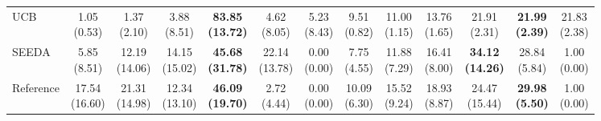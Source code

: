 {\begin{tabular}{l|cccccc|cccccc}
UCB & \makecell{1.05 \\ (0.53)} & \makecell{1.37 \\ (2.10)} & \makecell{3.88 \\ (8.51)} & {\cellcolor[HTML]{C8E6C9}} \bfseries \makecell{83.85 \\ (13.72)} & \makecell{4.62 \\ (8.05)} & \makecell{5.23 \\ (8.43)} & \makecell{9.51 \\ (0.82)} & \makecell{11.00 \\ (1.15)} & \makecell{13.76 \\ (1.65)} & {\cellcolor[HTML]{C8E6C9}} \makecell{21.91 \\ (2.31)} & \bfseries \makecell{21.99 \\ (2.39)} & \makecell{21.83 \\ (2.38)} \\
SEEDA & \makecell{5.85 \\ (8.51)} & \makecell{12.19 \\ (14.06)} & \makecell{14.15 \\ (15.02)} & {\cellcolor[HTML]{C8E6C9}} \bfseries \makecell{45.68 \\ (31.78)} & \makecell{22.14 \\ (13.78)} & \makecell{0.00 \\ (0.00)} & \makecell{7.75 \\ (4.55)} & \makecell{11.88 \\ (7.29)} & \makecell{16.41 \\ (8.00)} & {\cellcolor[HTML]{C8E6C9}} \bfseries \makecell{34.12 \\ (14.26)} & \makecell{28.84 \\ (5.84)} & \makecell{1.00 \\ (0.00)} \\
Reference & \makecell{17.54 \\ (16.60)} & \makecell{21.31 \\ (14.98)} & \makecell{12.34 \\ (13.10)} & {\cellcolor[HTML]{C8E6C9}} \bfseries \makecell{46.09 \\ (19.70)} & \makecell{2.72 \\ (4.44)} & \makecell{0.00 \\ (0.00)} & \makecell{10.09 \\ (6.30)} & \makecell{15.52 \\ (9.24)} & \makecell{18.93 \\ (8.87)} & {\cellcolor[HTML]{C8E6C9}} \makecell{24.47 \\ (15.44)} & \bfseries \makecell{29.98 \\ (5.50)} & \makecell{1.00 \\ (0.00)} \\

\end{tabular}}
